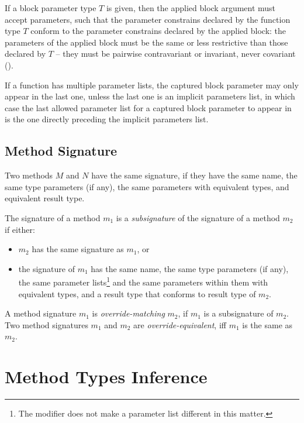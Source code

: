 If a block parameter type $T$ is given, then the applied block argument must accept parameters, such that the parameter constrains declared by the function type $T$ conform to the parameter constrains declared by the applied block: the parameters of the applied block must be the same or less restrictive than those declared by $T$ -- they must be pairwise contravariant or invariant, never covariant (). 

If a function has multiple parameter lists, the captured block parameter may only appear in the last one, unless the last one is an implicit parameters list, in which case the last allowed parameter list for a captured block parameter to appear in is the one directly preceding the implicit parameters list. 





\subsection{Method Signature}
\label{sec:method-signature}

Two methods $M$ and $N$ have the same signature, if they have the same name, the same type parameters (if any), the same parameters with equivalent types, and equivalent result type. 

The signature of a method $m_1$ is a {\em subsignature} of the signature of a method $m_2$ if either:
\begin{itemize}
\item $m_2$ has the same signature as $m_1$, or
\item the signature of $m_1$ has the same name, the same type parameters (if any), the same parameter lists\footnote{The  modifier does not make a parameter list different in this matter.} and the same parameters within them with equivalent types, and a result type that conforms to result type of $m_2$. 
\end{itemize}

A method signature $m_1$ is {\em override-matching} $m_2$, if $m_1$ is a subsignature of $m_2$. Two method signatures $m_1$ and $m_2$ are {\em override-equivalent}, iff $m_1$ is the same as $m_2$. 






\section{Method Types Inference}
\label{sec:method-types-inference}

